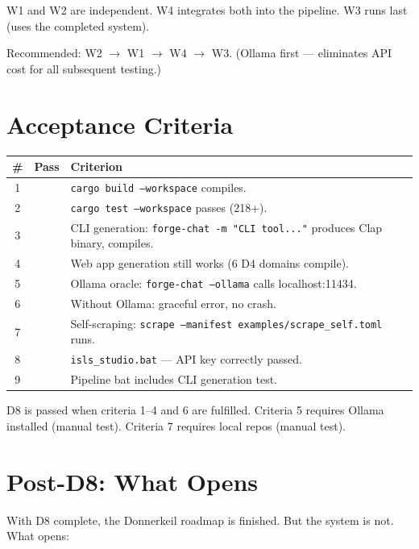 \documentclass[11pt,a4paper]{article}
\begin{document}
W1 and W2 are independent. W4 integrates both into the pipeline.
W3 runs last (uses the completed system).

Recommended: W2 $\to$ W1 $\to$ W4 $\to$ W3.
(Ollama first --- eliminates API cost for all subsequent testing.)


\section{Acceptance Criteria}

\begin{longtable}{clp{9cm}}
\toprule
\textbf{\#} & \textbf{Pass} & \textbf{Criterion} \\
\midrule
1 & & \texttt{cargo build --workspace} compiles. \\
2 & & \texttt{cargo test --workspace} passes (218+). \\
3 & & CLI generation: \texttt{forge-chat -m "CLI tool..."} 
      produces Clap binary, compiles. \\
4 & & Web app generation still works (6 D4 domains compile). \\
5 & & Ollama oracle: \texttt{forge-chat --ollama} calls 
      localhost:11434. \\
6 & & Without Ollama: graceful error, no crash. \\
7 & & Self-scraping: \texttt{scrape --manifest 
      examples/scrape\_self.toml} runs. \\
8 & & \texttt{isls\_studio.bat} --- API key correctly passed. \\
9 & & Pipeline bat includes CLI generation test. \\
\bottomrule
\end{longtable}

D8 is passed when criteria 1--4 and 6 are fulfilled.
Criteria 5 requires Ollama installed (manual test).
Criteria 7 requires local repos (manual test).


\section{Post-D8: What Opens}

With D8 complete, the Donnerkeil roadmap is finished. But the system 
is not. What opens:
\end{document}
